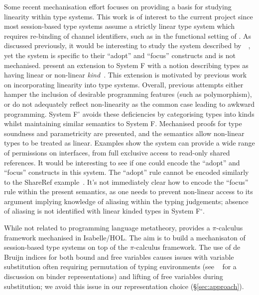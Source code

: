 \documentclass{mprop}
\newcommand{\fpop}{System F${}^\circ$\xspace}
\begin{document}
Some recent mechanisation effort focuses on providing a basis for studying linearity within type systems. This work is of interest to the current project since most session-based type systems assume a strictly linear type system which requires re-binding of channel identifiers, such as in the functional setting of \citeauthor{Gay:2010:LAST}. As discussed previously, it would be interesting to study the system described by~\citeauthor{Fahndrich:2002}~\cite{Fahndrich:2002}, yet the system is specific to their ``adopt'' and ``focus'' constructs and is not mechanised. \citeauthor{Mazurak:2010:LLT} present an extension to System F with a notion describing types as having linear or non-linear \textit{kind}~\cite{Mazurak:2010:LLT}. This extension is motivated by previous work on incorporating linearity into type systems. Overall, previous attempts either hamper the inclusion of desirable programming features (such as polymorphism), or do not adequately reflect non-linearity as the common case leading to awkward programming. \fpop avoids these deficiencies by categorising types into kinds whilst maintaining similar semantics to System F. Mechanised proofs for type soundness and parametricity are presented, and the semantics allow non-linear types to be treated as linear. Examples show the system can provide a wide range of permissions on interfaces, from full exclusive access to read-only shared references. It would be interesting to see if one could encode the ``adopt'' and ``focus'' constructs in this system. The ``adopt'' rule cannot be encoded similarly to the ShareRef example~\cite{Mazurak:2010:LLT}. It's not immediately clear how to encode the ``focus'' rule within the present semantics, as one needs to prevent non-linear access to its argument implying knowledge of aliasing within the typing judgements; absence of aliasing is not identified with linear kinded types in \fpop.

While not related to programming language metatheory, \citeauthor{Gay:2001:FFP} provides a $\pi$-calculus framework mechanised in Isabelle/HOL. The aim is to build a mechanisaton of session-based type systems on top of the $\pi$-calculus framework. The use of de Bruijn indices for both bound and free variables causes issues with variable substitution often requiring permutation of typing environments (see \citeauthor{Aydemir:2008:EFM}~\cite{Aydemir:2008:EFM} for a discussion on binder representations) and lifting of free variables during substitution; we avoid this issue in our representation choice (\S \ref{sec:approach}).
\end{document}
